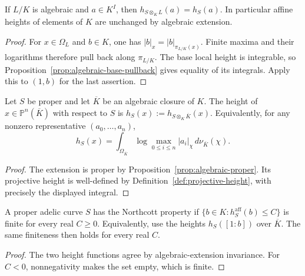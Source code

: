 \begin{proposition}
\label{prop:height-algebraic-extension}
\leanok
If $L/K$ is algebraic and $a\in K^I$, then
$h_{S\otimes_K L}(a)=h_S(a)$. In particular affine heights of
elements of $K$ are unchanged by algebraic extension.
\end{proposition}
\begin{proof}
For $x\in\Omega_L$ and $b\in K$, one has
$|b|_x=|b|_{\pi_{L/K}(x)}$. Finite maxima and their logarithms
therefore pull back along $\pi_{L/K}$. The base local height is
integrable, so Proposition~\ref{prop:algebraic-base-pullback} gives
equality of its integrals. Apply this to $(1,b)$ for the last assertion.
\end{proof}

\begin{definition}
\label{def:absolute-projective-height}
\leanok
Let $S$ be proper and let $\overline K$ be an algebraic closure of $K$.
The height of $x\in\mathbb P^n(\overline K)$ with respect to $S$ is
$h_S(x):=h_{S\otimes_K\overline K}(x)$.
Equivalently, for any nonzero representative $(a_0,\ldots,a_n)$,
\[
 h_S(x)=\int_{\Omega_{\overline K}}
 \log\max_{0\leq i\leq n}|a_i|_\chi\,d\nu_{\overline K}(\chi).
\]
\end{definition}
\begin{proof}
The extension is proper by Proposition~\ref{prop:algebraic-proper}.
Its projective height is well-defined by
Definition~\ref{def:projective-height}, with precisely the displayed integral.
\end{proof}

\begin{definition}\label{def:northcott-property}
\leanok
A proper adelic curve $S$ has the Northcott property if
$\{b\in K:h_S^{\mathrm{aff}}(b)\leq C\}$ is finite for every real
$C\geq0$. Equivalently, use the heights $h_S([1:b])$ over $\overline K$.
The same finiteness then holds for every real $C$.
\end{definition}
\begin{proof}
The two height functions agree by algebraic-extension invariance.
For $C<0$, nonnegativity makes the set empty, which is finite.
\end{proof}
